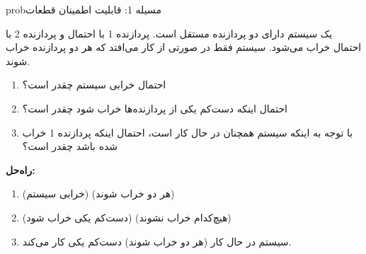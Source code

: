 \begin{PSbox}[unbreakable]{prob}{مسیله 1: قابلیت اطمینان قطعات}

یک سیستم دارای دو پردازنده مستقل است. پردازنده 1 با احتمال  و پردازنده 2 با احتمال  خراب می‌شود. سیستم فقط در صورتی از کار می‌افتد که هر دو پردازنده خراب شوند.

\begin{enumerate}
\def\labelenumi{(\alph{enumi})}
\tightlist
\item
  احتمال خرابی سیستم چقدر است؟
\item
  احتمال اینکه دست‌کم یکی از پردازنده‌ها خراب شود چقدر است؟
\item
  با توجه به اینکه سیستم همچنان در حال کار است، احتمال اینکه پردازنده 1 خراب شده باشد چقدر است؟
\end{enumerate}

\textbf{راه‌حل:}

\begin{enumerate}
\def\labelenumi{(\alph{enumi})}
\item
  (خرابی سیستم) (هر دو خراب شوند) 
\item
  (دست‌کم یکی خراب شود) (هیچ‌کدام خراب نشوند) 
\item
  سیستم در حال کار (هر دو خراب شوند) \lr{=} دست‌کم یکی کار می‌کند.\PSbr{}\PSbr{}
\end{enumerate}

\end{PSbox}

